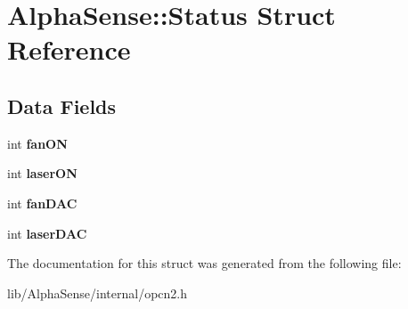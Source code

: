 \hypertarget{structAlphaSense_1_1Status}{}\section{Alpha\+Sense\+:\+:Status Struct Reference}
\label{structAlphaSense_1_1Status}
\subsection*{Data Fields}
\begin{DoxyCompactItemize}
\item 
\mbox{\label{structAlphaSense_1_1Status_a4b015a085d0d046733e40b71e469efd8}} 
int {\bfseries fan\+ON}
\item 
\mbox{\label{structAlphaSense_1_1Status_a0b60639796b88d7aaa111f27366f0b69}} 
int {\bfseries laser\+ON}
\item 
\mbox{\label{structAlphaSense_1_1Status_af3831b1441ca6e15fe6b1a7e840c4612}} 
int {\bfseries fan\+D\+AC}
\item 
\mbox{\label{structAlphaSense_1_1Status_a7d651cd56c32a59ed05b71dd7238e905}} 
int {\bfseries laser\+D\+AC}
\end{DoxyCompactItemize}


The documentation for this struct was generated from the following file\+:\begin{DoxyCompactItemize}
\item 
lib/\+Alpha\+Sense/internal/opcn2.\+h\end{DoxyCompactItemize}

